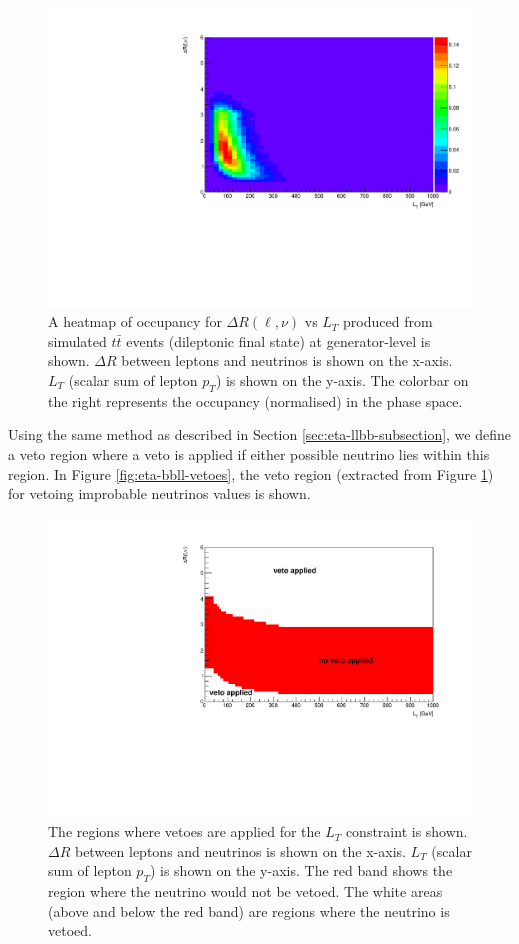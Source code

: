  \begin{figure}[h!]
	\includegraphics[width=0.6\linewidth]{figures/lt_occ_2vSM.pdf}
	\centering
	\caption{A heatmap of occupancy for $\Delta R (\ell, \nu)$ vs $L_{T}$ produced from simulated $t\bar{t}$ events (dileptonic final state) at generator-level is shown. $\Delta R$ between leptons and neutrinos is shown on the x-axis. $L_{T}$ (scalar sum of lepton $p_{T}$) is shown on the y-axis. The colorbar on the right represents the occupancy (normalised) in the phase space. }
	\label{fig:lt-heatmap}
\end{figure}

Using the same method as described in Section \ref{sec:eta-llbb-subsection}, we define a veto region where a veto is applied if either possible neutrino lies within this region. In Figure \ref{fig:eta-bbll-vetoes}, the veto region (extracted from Figure \ref{fig:lt-heatmap}) for vetoing improbable neutrinos values is shown.
\begin{figure}[h!]
	\includegraphics[scale=0.6]{figures/lt_veto_2vSM.pdf}
	\centering
	\caption{The regions where vetoes are applied for the $L_{T}$ constraint is shown. $\Delta R$ between leptons and neutrinos is shown on the x-axis. $L_{T}$ (scalar sum of lepton $p_{T}$) is shown on the y-axis. The red band shows the region where the neutrino would not be vetoed. The white areas (above and below the red band) are regions where the neutrino is vetoed.}
	\label{fig:lt-vetoes}
\end{figure}



